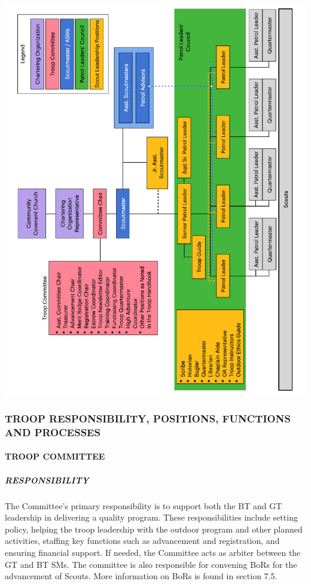 \documentclass{ltxguide}
\begin{document}
\includegraphics[angle=-90,scale=0.6,origin=c]{TroopOrgChart.pdf}

\subsubsection{TROOP RESPONSIBILITY, POSITIONS, FUNCTIONS AND PROCESSES}
\paragraph{TROOP COMMITTEE}
\subparagraph{RESPONSIBILITY}
The Committee's primary responsibility is to support both the \ac{BT} and \ac{GT} leadership in delivering a quality program. These responsibilities include setting policy, helping the troop leadership with the outdoor program and other planned activities, staffing key functions such as advancement and registration, and ensuring financial support. If needed, the Committee acts as arbiter between the \ac{GT} and \ac{BT} \acp{SM}. The committee is also responsible for convening \acp{BoR}  for the advancement of Scouts. More information on \acp{BoR} is found in section 7.5. %
\end{document}
